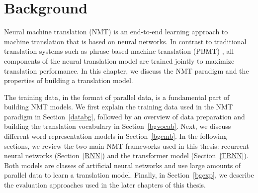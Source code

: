

\chapter{Background}
\label{chapter:background} \label{nmtsec}

Neural machine translation (NMT) is an end-to-end learning approach to machine translation that is based on neural networks.
In contrast to traditional translation systems such as phrase-based machine translation (PBMT) \citep{koehn-etal-2003-statistical}, all components of the neural translation model are trained jointly to maximize translation performance.
In this chapter, we discuss the NMT paradigm and the properties of building a translation model.

The training data, in the format of parallel data, is a fundamental part of building NMT models.
We first explain the training data used in the NMT paradigm in Section~\ref{databg}, followed by an overview of data preparation and building the translation vocabulary in Section~\ref{bgvocab}.
Next, we discuss different word representation models in Section~\ref{bgemb}. 
In the following sections, we review the two main NMT frameworks used in this thesis: recurrent neural networks (Section~\ref{RNN}) and the transformer model (Section~\ref{TRNN}). 
Both models are classes of artificial neural networks and use large amounts of parallel data to learn a translation model. 
Finally, in Section~\ref{bgexp}, we describe the evaluation approaches used in the later chapters of this thesis. 










 


